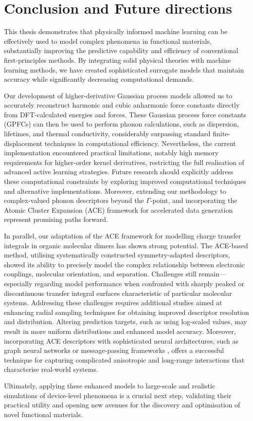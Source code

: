 \chapter{Conclusion and Future directions}
\label{ch:5}
This thesis demonstrates that physically informed machine learning can be effectively used to model complex phenomena in functional materials, substantially improving the predictive capability and efficiency of conventional first-principles methods. By integrating solid physical theories with machine learning methods, we have created sophisticated surrogate models that maintain accuracy while significantly decreasing computational demands.

Our development of higher-derivative Gaussian process models allowed us to accurately reconstruct harmonic and cubic anharmonic force constants directly from DFT-calculated energies and forces. These Gaussian process force constants (GPFCs) can then be used to perform phonon calculations, such as dispersion, lifetimes, and thermal conductivity, considerably surpassing standard finite-displacement techniques in computational efficiency. Nevertheless, the current implementation encountered practical limitations, notably high memory requirements for higher-order kernel derivatives, restricting the full realisation of advanced active learning strategies. Future research should explicitly address these computational constraints by exploring improved computational techniques and alternative implementations. Moreover, extending our methodology to complex-valued phonon descriptors beyond the $\Gamma$-point, and incorporating the Atomic Cluster Expansion (ACE) framework for accelerated data generation represent promising paths forward.

In parallel, our adaptation of the ACE framework for modelling charge transfer integrals in organic molecular dimers has shown strong potential. The ACE-based method, utilising systematically constructed symmetry-adapted descriptors, showed its ability to precisely model the complex relationship between electronic couplings, molecular orientation, and separation. Challenges still remain—especially regarding model performance when confronted with sharply peaked or discontinuous transfer integral surfaces characteristic of particular molecular systems. Addressing these challenges requires additional studies aimed at enhancing radial sampling techniques for obtaining improved descriptor resolution and distribution. Altering prediction targets, such as using log-scaled values, may result in more uniform distributions and enhanced model accuracy. Moreover, incorporating ACE descriptors with sophisticated neural architectures, such as graph neural networks or message-passing frameworks \cite{https://doi.org/10.48550/arxiv.2206.07697, Batatia2025}, offers a successful technique for capturing complicated anisotropic and long-range interactions that characterise real-world systems.

Ultimately, applying these enhanced models to large-scale and realistic simulations of device-level phenomena is a crucial next step, validating their practical utility and opening new avenues for the discovery and optimisation of novel functional materials.

